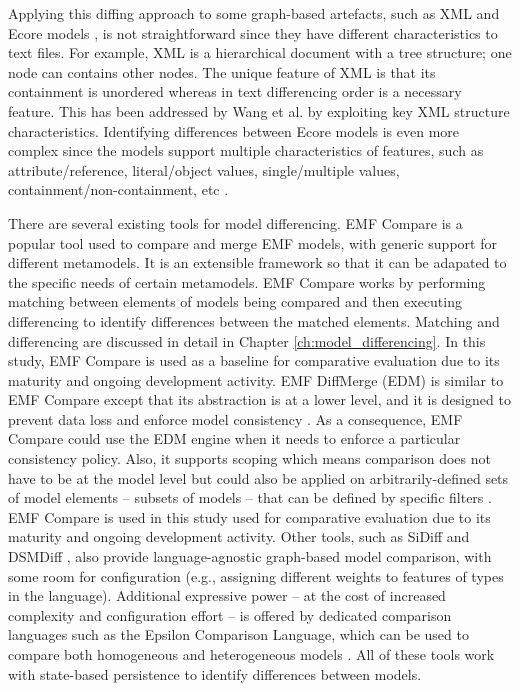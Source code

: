Applying this diffing approach to some graph-based artefacts, such as XML \cite{w3c-xml} and Ecore models \cite{steinberg2008emf}, is not straightforward since they have different characteristics to text files. For example, XML is a hierarchical document with a tree structure; one node can contains other nodes. The unique feature of XML is that its containment is  unordered whereas in text differencing order is a necessary feature. This has been addressed by Wang et al. \cite{wang2003xdiff} by exploiting key XML  structure characteristics. Identifying differences between Ecore models is even more complex since the models support multiple characteristics of features, such as attribute/reference, literal/object values, single/multiple values, containment/non-containment, etc \cite{steinberg2008emf}. 

There are several existing tools for model differencing. 
EMF Compare \cite{emfcompare2018developer} is a popular tool used to compare and merge EMF models, with generic support for different metamodels. It is an extensible framework so that it can be adapated to the specific needs of certain metamodels. EMF Compare works by performing matching between elements of models being compared and then executing differencing to identify differences between the matched elements. Matching and differencing are discussed in detail in Chapter \ref{ch:model_differencing}. In this study, EMF Compare is used as a baseline for comparative evaluation due to its maturity and ongoing development activity. EMF DiffMerge (EDM) \cite{eclipse2019emfdiffmerge} is similar to EMF Compare except that its abstraction is at a lower level, and it is designed to prevent data loss and enforce model consistency \cite{eclipse2019emfdiffmerge2}. As a consequence, EMF Compare could use the EDM engine when it needs to enforce a particular consistency policy. Also, it supports scoping which means comparison does not have to be at the model level but could also be applied on arbitrarily-defined sets of model elements -- subsets of models -- that can be defined by specific filters \cite{jaxenter2019emfdiffmerge}. EMF Compare is used in this study used for comparative evaluation due to its maturity and ongoing development activity. Other tools, such as SiDiff \cite{Treude2007SiDiff} and DSMDiff \cite{lin2009dsmdiff},  also provide language-agnostic graph-based model comparison, with some room for configuration (e.g., assigning different weights to features of types in the language). Additional expressive power -- at the cost of increased complexity and configuration effort -- is offered by dedicated comparison languages such as the Epsilon Comparison Language, which can be used to compare both homogeneous and heterogeneous models \cite{kolovos2009ecl}. All of these tools work with state-based persistence to identify differences between models.

